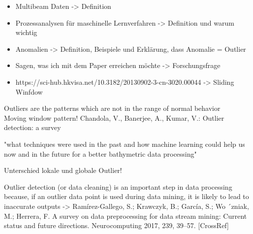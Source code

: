 

\begin{itemize}
	\item Multibeam Daten -> Definition
	\item Prozessanalysen für maschinelle Lernverfahren -> Definition und warum wichtig
	\item Anomalien -> Definition, Beispiele und Erklärung, dass Anomalie = Outlier
	\item Sagen, was ich mit dem Paper erreichen möchte -> Forschungsfrage
	\item https://sci-hub.hkvisa.net/10.3182/20130902-3-cn-3020.00044 -> Sliding Winfdow
\end{itemize}

Outliers are the patterns which are not in the range of normal behavior \cite{vinuthaDetectionOutliersUsing2018} \linebreak
\\
Moving window pattern! \linebreak
Chandola, V., Banerjee, A., Kumar, V.: Outlier detection: a survey\linebreak

"what techniques were used in the past and how machine learning
could help us now and in the future for a better bathymetric
data processing" \linebreak

Unterschied lokale und globale Outlier! \linebreak

Outlier detection (or data
cleaning) is an important step in data processing because, if an outlier data point is used
during data mining, it is likely to lead to inaccurate outputs -> 
Ramírez-Gallego, S.; Krawczyk, B.; García, S.; Wo ´zniak, M.; Herrera, F. A survey on data preprocessing for data stream mining:
Current status and future directions. Neurocomputing 2017, 239, 39–57. [CrossRef]

